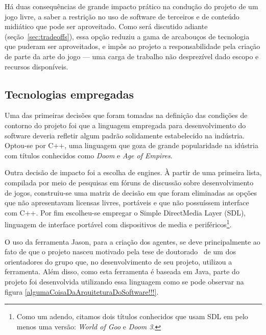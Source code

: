 Há duas consequências de grande impacto prático na condução do projeto de um jogo livre,  a saber a restrição no uso de software de terceiros e de conteúdo midiático que pode ser aproveitado. Como será discutido adiante (seção~\ref{sec:tradeoffs}), essa opção reduziu a gama de arcabouços de tecnologia que puderam ser aproveitados, e impôs ao projeto a responsabilidade pela criação de parte da arte do jogo --- uma carga de trabalho não desprezível dado escopo e recursos disponíveis.  

\subsection{Tecnologias empregadas}\label{tecnologias_empregadas}

Uma das primeiras decisões que foram tomadas na definição das condições de contorno do projeto foi que a linguagem empregada para desenvolvimento do software deveria refletir algum padrão solidamente estabelecido na indústria. Optou-se por C++, uma linguagem que goza de grande popularidade na idústria com títulos conhecidos como \emph{Doom} e \emph{Age of Empires}.

Outra decisão de impacto foi a escolha de engines. À partir de uma primeira lista, compilada por meio de pesquisas em fóruns de discussão sobre desenvolvimento de jogos, construiu-se uma matriz de decisão em que foram eliminadas as opções que não apresentavam licensas livres, portáveis e que não possuíssem interface com C++. Por fim escolheu-se empregar o Simple DirectMedia Layer (SDL), linguagem de interface portável com dispositivos de media e periféricos\footnote{Como um adendo, citamos dois títulos conhecidos que usam SDL em pelo menos uma versão: \emph{World of Goo} e \emph{Doom 3}.}.

O uso da ferramenta Jason, para a criação dos agentes, se deve principalmente ao fato de que o projeto nasceu motivado pela tese de doutorado~\cite{tese_roberto} de um dos orientadores do grupo que, no desenvolvimento de seu projeto, utilizou a ferramenta. Além disso, como esta ferramenta é baseada em Java, parte do projeto foi desenvolvida utilizando essa linguagem como se pode observar na figura \ref{algumaCoisaDaArquiteturaDoSoftware!!!}.




